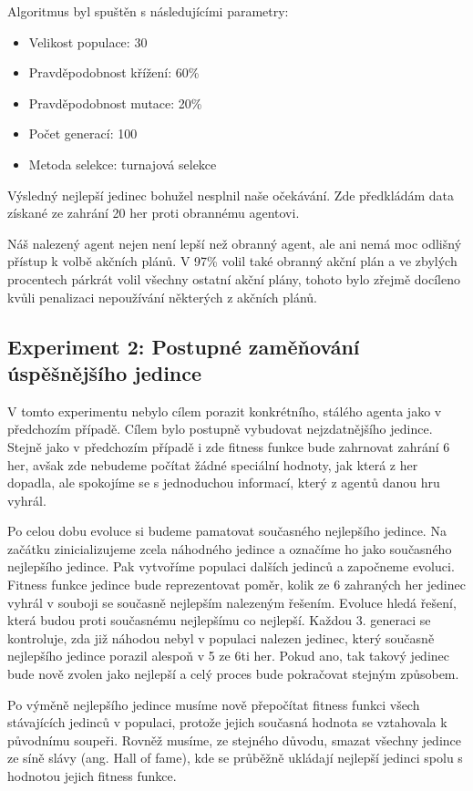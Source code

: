 Algoritmus byl spuštěn s následujícími parametry:
\begin{itemize}
    \item Velikost populace: 30
    \item Pravděpodobnost křížení: 60\%
    \item Pravděpodobnost mutace: 20\%
    \item Počet generací: 100
    \item Metoda selekce: turnajová selekce
\end{itemize}

Výsledný nejlepší jedinec bohužel nesplnil naše očekávání. Zde předkládám data získané ze zahrání 20 her proti obrannému agentovi.

Náš nalezený agent nejen není lepší než obranný agent, ale ani nemá moc odlišný přístup k volbě akčních plánů. 
V 97\% volil také obranný akční plán a ve zbylých procentech párkrát volil všechny ostatní akční plány, tohoto bylo zřejmě docíleno kvůli penalizaci nepoužívání některých z akčních plánů.






\subsection{Experiment 2: Postupné zaměňování úspěšnějšího jedince}
V tomto experimentu nebylo cílem porazit konkrétního, stálého agenta jako v předchozím případě.
Cílem bylo postupně vybudovat nejzdatnějšího jedince.
Stejně jako v předchozím případě i zde fitness funkce bude zahrnovat zahrání 6 her,
avšak zde nebudeme počítat žádné speciální hodnoty, jak která z her dopadla, ale spokojíme se s jednoduchou informací, který z agentů danou hru vyhrál.
\par
Po celou dobu evoluce si budeme pamatovat současného nejlepšího jedince. 
Na začátku zinicializujeme zcela náhodného jedince a označíme ho jako současného nejlepšího jedince.
Pak vytvoříme populaci dalších jedinců a započneme evoluci.
Fitness funkce jedince bude reprezentovat poměr, kolik ze 6 zahraných her jedinec vyhrál v souboji se současně nejlepším nalezeným řešením.
Evoluce hledá řešení, která budou proti současnému nejlepšímu co nejlepší.
Každou 3. generaci se kontroluje, zda již náhodou nebyl v populaci nalezen jedinec, který současně nejlepšího jedince porazil alespoň v 5 ze 6ti her.
Pokud ano, tak takový jedinec bude nově zvolen jako nejlepší a celý proces bude pokračovat stejným způsobem.
\par
Po výměně nejlepšího jedince musíme nově přepočítat fitness funkci všech stávajících jedinců v populaci, protože jejich současná hodnota se vztahovala k původnímu soupeři.
Rovněž musíme, ze stejného důvodu, smazat všechny jedince ze síně slávy (ang. Hall of fame), kde se průběžně ukládají nejlepší jedinci spolu s hodnotou jejich fitness funkce.

